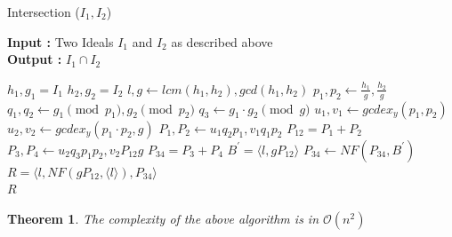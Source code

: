 \documentclass{article}
\newtheorem{theorem}{Theorem}[section]
\begin{document}
\newpage
\begin{algorithm}
    \caption{Intersection ($I_{1}, I_{2}$)} \label{alg:intersect-2-ideals}
    \textbf{Input : }Two Ideals $I_{1}$ and $I_{2}$ as described above \\
    \textbf{Output : }$I_{1} \cap I_{2}$
\begin{algorithmic}
    \State $h_{1}, g_{1} = I_{1}$ 
    \State $h_{2}, g_{2} = I_{2}$ 
    \State $l, g \gets lcm(h_{1}, h_{2}), gcd(h_{1}, h_{2})$
    \State $p_{1}, p_{2} \gets \frac{h_{1}}{g}, \frac{h_{2}}{g}$
    \State $q_{1}, q_{2} \gets g_{1} \pmod {p_{1}}, g_{2} \pmod {p_{2}}$
    \State $q_{3} \gets g_{1} \cdot g_{2} \pmod {g}$ 
    \State $u_{1}, v_{1} \gets gcdex_{y} (p_{1}, p_{2})$ 
    \State $u_{2}, v_{2} \gets gcdex_{y} (p_{1} \cdot p_{2}, g)$ 
    \State $P_{1}, P_{2} \gets u_{1}q_{2}p_{1}, v_{1}q_{1}p_{2}$ 
    \State $P_{12} = P_{1} + P_{2}$
    \State $P_{3}, P_{4} \gets u_{2}q_{3}p_{1}p_{2}, v_{2}P_{12}g$
    \State $P_{34} = P_{3} + P_{4}$
    \State $B^{\prime} = \langle l, gP_{12} \rangle$
    \State $P_{34} \gets NF(P_{34}, B^{\prime})$
    \State $R = \langle l, NF(gP_{12}, \langle l \rangle), P_{34} \rangle$ \\
    \Return $R$
\end{algorithmic}
\end{algorithm}

\begin{theorem} The complexity of the above algorithm is in $\mathcal{O}(n^2)$
\end{theorem}
\end{document}

